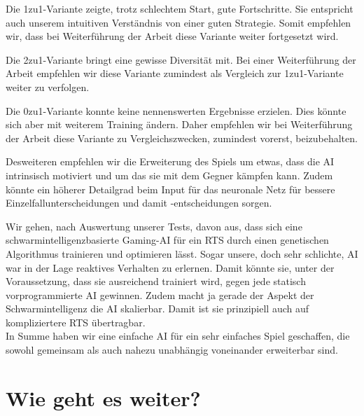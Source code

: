 \documentclass[
	12pt,
	a4paper,
	BCOR10mm,
	DIV14,
	headsepline,
	usegeometry,
]{scrreprt}
\begin{document}
Die 1zu1-Variante zeigte, trotz schlechtem Start, gute Fortschritte.
Sie entspricht auch unserem intuitiven Verständnis von einer guten Strategie.
Somit empfehlen wir, dass bei Weiterführung der Arbeit diese Variante weiter fortgesetzt wird.

Die 2zu1-Variante bringt eine gewisse Diversität mit.
Bei einer Weiterführung der Arbeit empfehlen wir diese Variante zumindest als Vergleich zur 1zu1-Variante weiter zu verfolgen.

Die 0zu1-Variante konnte keine nennenswerten Ergebnisse erzielen.
Dies könnte sich aber mit weiterem Training ändern.
Daher empfehlen wir bei Weiterführung der Arbeit diese Variante zu Vergleichszwecken, zumindest vorerst, beizubehalten.

Desweiteren empfehlen wir die Erweiterung des Spiels um etwas, dass die AI intrinsisch motiviert und um das sie mit dem Gegner kämpfen kann.
Zudem könnte ein höherer Detailgrad beim Input für das neuronale Netz für bessere Einzelfallunterscheidungen und damit -entscheidungen sorgen.

Wir gehen, nach Auswertung unserer Tests, davon aus, dass sich eine schwarmintelligenzbasierte Gaming-AI für ein RTS durch einen genetischen Algorithmus trainieren und optimieren lässt.
Sogar unsere, doch sehr schlichte, AI war in der Lage reaktives Verhalten zu erlernen.
Damit könnte sie, unter der Voraussetzung, dass sie ausreichend trainiert wird, gegen jede statisch vorprogrammierte AI gewinnen.
Zudem macht ja gerade der Aspekt der Schwarmintelligenz die AI skalierbar.
Damit ist sie prinzipiell auch auf kompliziertere RTS übertragbar.\\
In Summe haben wir eine einfache AI für ein sehr einfaches Spiel geschaffen, die sowohl gemeinsam als auch nahezu unabhängig voneinander erweiterbar sind.


\chapter{Wie geht es weiter?}
\label{Wie geht es weiter?}
\end{document}
